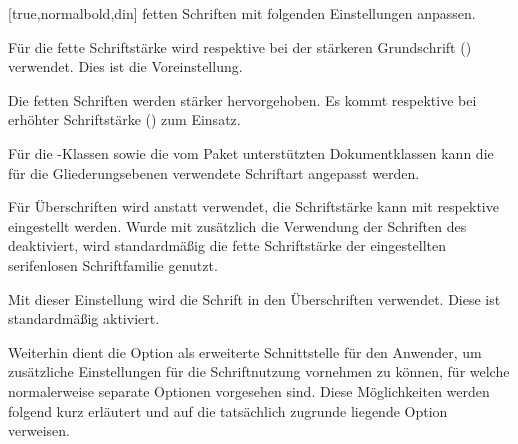 \begin{Declaration*}{}
\begin{Declaration*}{}
\begin{Declaration*}{}
\begin{Declaration}[%
  v2.02!\Option{cdfont=head};
  v2.02!\Option{cdfont=heavyhead};
  v2.03!\Option{cdfont=din};
  v2.03!\Option{cdfont=nodin};
  v2.05!\Option{cdfont=normalbold};
  v2.05!\Option{cdfont=ultrabold};
]{}[true,normalbold,din]
fetten Schriften mit folgenden Einstellungen anpassen.
%
\begin{values}{}
\item[normalbold]
  Für die fette Schriftstärke wird  respektive bei 
  der stärkeren Grundschrift ()  
  verwendet. Dies ist die Voreinstellung.
\item[ultrabold/heavybold]
  Die fetten Schriften werden stärker hervorgehoben. Es kommt 
   respektive  bei erhöhter 
  Schriftstärke () zum Einsatz.
\end{values}
%
Für die \TUDScript-Klassen sowie die vom Paket  
unterstützten Dokumentklassen kann die für die Gliederungsebenen verwendete 
Schriftart angepasst werden.
%
\begin{values}{}
\item[nodin]
  Für Überschriften wird \Univers anstatt \DIN verwendet, die Schriftstärke 
  kann mit  respektive  eingestellt 
  werden. Wurde mit  zusätzlich die Verwendung der 
  Schriften des \CDs deaktiviert, wird standardmäßig die fette Schriftstärke 
  der eingestellten serifenlosen Schriftfamilie genutzt.
\item[din]
  Mit dieser Einstellung wird die Schrift \DIN in den Überschriften verwendet. 
  Diese ist standardmäßig aktiviert.
\end{values}
%
Weiterhin dient die Option  als erweiterte Schnittstelle 
für den Anwender, um zusätzliche Einstellungen für die Schriftnutzung vornehmen 
zu können, für welche normalerweise separate Optionen vorgesehen sind. Diese 
Möglichkeiten werden folgend kurz erläutert und auf die tatsächlich zugrunde 
liegende Option verweisen.


\end{Declaration}
\end{Declaration*}
\end{Declaration*}
\end{Declaration*}
